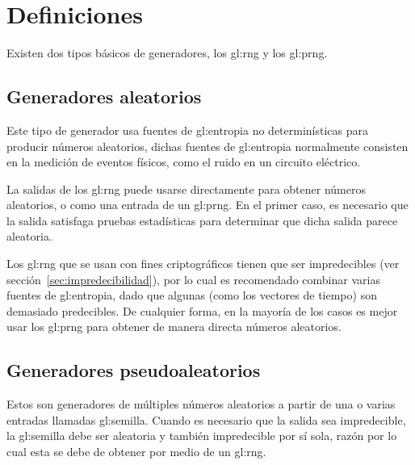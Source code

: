 %
%
%

\section{Definiciones} %

Existen dos tipos básicos de generadores, los \gls{gl:rng} y los \gls{gl:prng}.

\subsection{Generadores aleatorios} %

Este tipo de generador usa fuentes de \gls{gl:entropia} no determinísticas
para producir números aleatorios, dichas fuentes de \gls{gl:entropia}
normalmente consisten en la medición de eventos físicos, como el ruido
en un circuito eléctrico.

La salidas de los \gls{gl:rng} puede usarse directamente para obtener números
aleatorios, o como una entrada de un \gls{gl:prng}. En el primer caso, es
necesario que la salida satisfaga pruebas estadísticas para determinar que
dicha salida parece aleatoria.

Los \gls{gl:rng} que se usan con fines criptográficos tienen que ser
impredecibles (ver sección~\ref{sec:impredecibilidad}), por lo cual es
recomendado combinar varias fuentes de \gls{gl:entropia}, dado que algunas
(como los vectores de tiempo) son demasiado predecibles. De cualquier forma,
en la mayoría de los casos es mejor usar los \gls{gl:prng} para obtener de
manera directa números aleatorios.

\subsection{Generadores pseudoaleatorios} %

Estos son generadores de múltiples números aleatorios a partir de una o varias
entradas llamadas \gls{gl:semilla}. Cuando es necesario que la salida sea
impredecible, la \gls{gl:semilla} debe ser aleatoria y también impredecible
por sí sola, razón por lo cual esta se debe de obtener por medio de un
\gls{gl:rng}.

